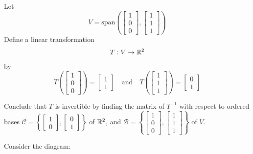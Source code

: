 \documentclass{ximera}
\begin{document}
\begin{example}\label{ex:inversematrixoftransform}

Let $$V=\text{span}\left(\begin{bmatrix}1\\0\\0\end{bmatrix}, \begin{bmatrix}1\\1\\1\end{bmatrix}\right)$$
Define a linear transformation $$T:V\rightarrow \mathbb{R}^2$$
by $$T\left(\begin{bmatrix}1\\0\\0\end{bmatrix}\right)=\begin{bmatrix}1\\1\end{bmatrix}\quad \text{and} \quad T\left(\begin{bmatrix}1\\1\\1\end{bmatrix}\right)=\begin{bmatrix}0\\1\end{bmatrix}$$


Conclude that $T$ is invertible by finding the matrix of $T^{-1}$ with respect to ordered bases $\mathcal{C}=\left\{\begin{bmatrix}1\\0\end{bmatrix},\begin{bmatrix}0\\1\end{bmatrix}\right\}$ of $\mathbb{R}^2$, and $\mathcal{B}=\left\{\begin{bmatrix}1\\0\\0\end{bmatrix}, \begin{bmatrix}1\\1\\1\end{bmatrix}\right\}$ of $V$.
\begin{explanation}
Consider the diagram:
\begin{center}
\end{center}
\end{explanation}
\end{example}
\end{document}
